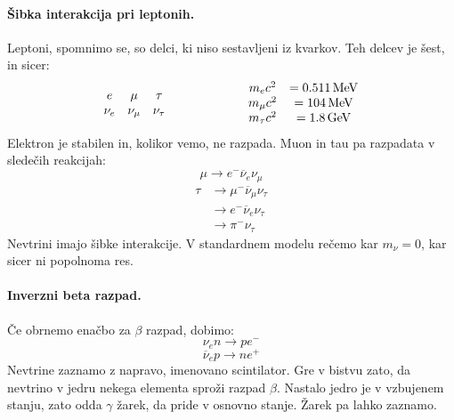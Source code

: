 \documentclass[a4paper]{article}
\begin{document}
\paragraph{Šibka interakcija pri leptonih.} Leptoni, spomnimo se, so delci, ki niso sestavljeni iz kvarkov. Teh delcev je šest, in sicer:
\[\begin{array}{c c c}
    e & \mu & \tau \\
    \nu_e & \nu_\mu & \nu_\tau
\end{array} \hspace{2cm} \begin{array}{c c}
    m_e c^2 & = 0.511\,\mathrm{MeV} \\
    m_\mu c^2 & = 104\,\mathrm{MeV} \\
    m_\tau c^2 & = 1.8\,\mathrm{GeV}
\end{array}\]
Elektron je stabilen in, kolikor vemo, ne razpada. Muon in tau pa razpadata v sledečih reakcijah:
\[\mu \to e^-\overline{\nu}_e\nu_\mu\]
\begin{align*}
    \tau & \to \mu^-\overline{\nu}_\mu\nu_\tau \\
    & \to e^-\overline{\nu}_e\nu_\tau \\
    & \to \pi^- \nu_\tau
\end{align*}
Nevtrini imajo šibke interakcije. V standardnem modelu rečemo kar \(m_\nu = 0\), kar sicer ni popolnoma res.
\paragraph{Inverzni beta razpad.} Če obrnemo enačbo za \(\beta\) razpad, dobimo:
\[\nu_e n \to pe^-\]
\[\overline{\nu}_e p \to ne^+\]
Nevtrine zaznamo z napravo, imenovano scintilator. Gre v bistvu zato, da nevtrino v jedru nekega elementa sproži razpad \(\beta\). Nastalo jedro je v vzbujenem stanju,
zato odda \(\gamma\) žarek, da pride v osnovno stanje. Žarek pa lahko zaznamo.
\end{document}
